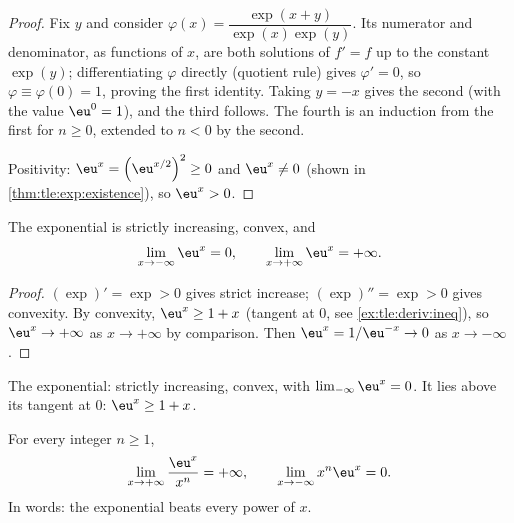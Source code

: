 \begin{proof}
Fix $y$ and consider $\varphi(x) = \dfrac{\exp(x+y)}{\exp(x)\exp(y)}$. Its
numerator and denominator, as functions of $x$, are both solutions of
$f' = f$ up to the constant $\exp(y)$; differentiating $\varphi$ directly
(quotient rule) gives $\varphi' = 0$, so
$\varphi \equiv \varphi(0) = 1$, proving the first identity. Taking
$y = -x$ gives the second (with the value $\eu^0 = 1$), and the third
follows. The fourth is an induction from the first for $n \geq 0$, extended
to $n < 0$ by the second.

Positivity: $\eu^x = \left(\eu^{x/2}\right)^2 \geq 0$ and $\eu^x \neq 0$
(shown in \cref{thm:tle:exp:existence}), so $\eu^x > 0$.
\end{proof}

\begin{proposition}\label{prop:tle:exp:variations}
The exponential is strictly increasing, convex, and
\[
\lim_{x\to-\infty} \eu^x = 0, \qquad
\lim_{x\to+\infty} \eu^x = +\infty .
\]
\end{proposition}

\begin{proof}
$(\exp)' = \exp > 0$ gives strict increase; $(\exp)'' = \exp > 0$ gives
convexity. By convexity, $\eu^x \geq 1 + x$ (tangent at $0$, see
\cref{ex:tle:deriv:ineq}), so $\eu^x \to +\infty$ as $x \to +\infty$ by
comparison. Then $\eu^{x} = 1/\eu^{-x} \to 0$ as $x \to -\infty$.
\end{proof}

\begin{omfigure}

{\small The exponential: strictly increasing, convex, with
$\lim_{-\infty} \eu^x = 0$. It lies above its tangent at $0$:
$\eu^x \geq 1 + x$.}
\end{omfigure}

\begin{theorem}\label{thm:tle:exp:growth}
For every integer $n \geq 1$,
\[
\lim_{x\to+\infty} \frac{\eu^x}{x^n} = +\infty,
\qquad
\lim_{x\to-\infty} x^n \eu^x = 0 .
\]
In words: the exponential beats every power of $x$.
\end{theorem}

